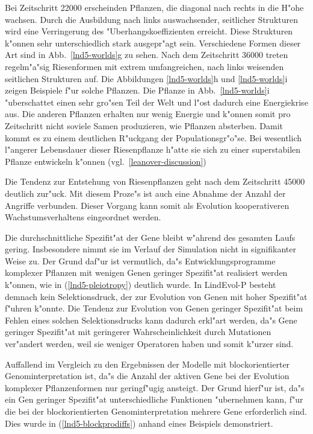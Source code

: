 Bei Zeitschritt 22000 erscheinden Pflanzen, die diagonal nach rechts in die H"ohe wachsen. Durch die Ausbildung nach links
auswachsender, seitlicher Strukturen wird eine Verringerung des "Uberhangskoeffizienten erreicht. Diese Strukturen k"onnen
sehr unterschiedlich stark ausgepr"agt sein. Verschiedene Formen dieser Art sind in Abb.\ \ref{lnd5-worlds}g zu sehen.
Nach dem Zeitschritt 36000 treten regelm"a"sig Riesenformen mit extrem umfangreichen, nach links weisenden seitlichen
Strukturen auf. Die Abbildungen \ref{lnd5-worlds}h und \ref{lnd5-worlds}i zeigen Beispiele f"ur solche Pflanzen. Die Pflanze
in Abb.\ \ref{lnd5-worlds}i "uberschattet einen sehr gro"sen Teil der Welt und l"ost dadurch eine Energiekrise aus. Die
anderen Pflanzen erhalten nur wenig Energie und k"onnen somit pro Zeitschritt nicht soviele Samen produzieren, wie Pflanzen
absterben. Damit kommt es zu einem deutlichen R"uckgang der Populationsgr"o"se. Bei wesentlich l"angerer Lebensdauer
dieser Riesenpflanze h"atte sie sich zu einer superstabilen Pflanze entwickeln k"onnen (vgl.\ \ref{leanover-discussion})

Die Tendenz zur Entstehung von Riesenpflanzen geht nach dem Zeitschritt 45000 deutlich zur"uck. Mit diesem Proze"s
ist auch eine Abnahme der Anzahl der Angriffe verbunden. Dieser Vorgang kann somit als Evolution kooperativeren
Wachstumsverhaltens eingeordnet werden.

Die durchschnittliche Spezifit"at der Gene bleibt w"ahrend des gesamten Laufs gering. Insbesondere nimmt sie im Verlauf der
Simulation nicht in signifikanter Weise zu. Der Grund daf"ur ist vermutlich, da"s Entwicklungsprogramme komplexer Pflanzen
mit wenigen Genen geringer Spezifit"at realisiert werden k"onnen, wie in (\ref{lnd5-pleiotropy}) deutlich wurde.
In LindEvol-P besteht demnach kein Selektionsdruck, der zur Evolution von Genen mit hoher Spezifit"at f"uhren k"onnte.
Die Tendenz zur Evolution von Genen geringer Spezifit"at beim Fehlen eines solchen Selektionsdrucks kann dadurch erkl"art
werden, da"s Gene geringer Spezifit"at mit geringerer Wahrscheinlichkeit durch Mutationen ver"andert werden, weil sie
weniger Operatoren haben und somit k"urzer sind.

Auffallend im Vergleich zu den Ergebnissen der Modelle mit blockorientierter Genominterpretation ist, da"s die Anzahl der
aktiven Gene bei der Evolution komplexer Pflanzenformen nur geringf"ugig ansteigt. Der Grund hierf"ur ist, da"s ein Gen
geringer Spezifit"at unterschiedliche Funktionen "ubernehmen kann, f"ur die bei der blockorientierten Genominterpretation
mehrere Gene erforderlich sind. Dies wurde in (\ref{lnd5-blockprodiffs}) anhand eines Beispiels demonstriert.

